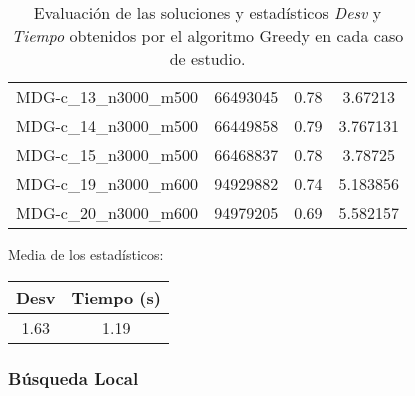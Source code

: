 \documentclass{article}
\begin{document}
\begin{table}[H]
\begin{tabular}{|cccc|}
		MDG-c\_13\_n3000\_m500 & 66493045 & 0.78 & 3.67213\\
		MDG-c\_14\_n3000\_m500 & 66449858 & 0.79 & 3.767131\\
		MDG-c\_15\_n3000\_m500 & 66468837 & 0.78 & 3.78725\\
		MDG-c\_19\_n3000\_m600 & 94929882 & 0.74 & 5.183856\\
		MDG-c\_20\_n3000\_m600 & 94979205 & 0.69 & 5.582157\\
		\hline
	\end{tabular}
	\caption{Evaluación de las soluciones y estadísticos \emph{Desv} y \emph{Tiempo} obtenidos por el algoritmo Greedy
		en cada caso de estudio.}
	\label{tab:greedy}
\end{table}

Media de los estadísticos:
\begin{table}[H]
	\centering
	\begin{tabular}{|cc|}
		\hline
		Desv & Tiempo (s)\\ \hline
		1.63 & 1.19 \\
		\hline
	\end{tabular}
\end{table}

\pagebreak

\subsubsection*{Búsqueda Local}
\end{document}
